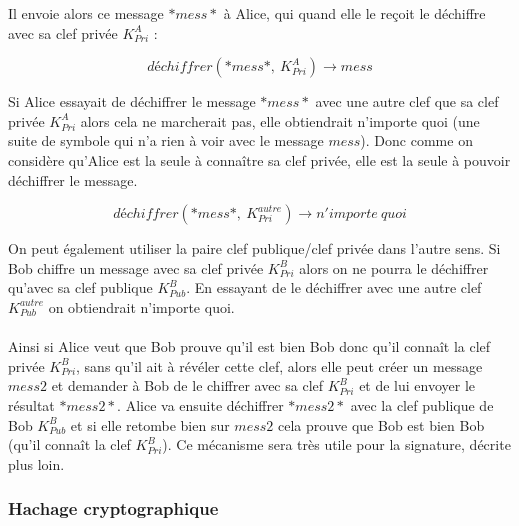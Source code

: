 \documentclass[11pt,a4paper]{article}
\begin{document}
Il envoie alors ce message $*mess*$ à Alice, qui quand elle le reçoit le déchiffre avec sa clef privée $K_{Pri}^{A}$ :

$$déchiffrer(*mess*, ~K_{Pri}^{A}) \rightarrow mess$$

Si Alice essayait de déchiffrer le message $*mess*$ avec une autre clef que sa clef privée $K_{Pri}^{A}$ alors cela ne marcherait pas, elle obtiendrait n'importe quoi (une suite de symbole qui n'a rien à voir avec le message $mess$). Donc comme on considère qu'Alice est la seule à connaître sa clef privée, elle est la seule à pouvoir déchiffrer le message.

$$déchiffrer(*mess*, ~K_{Pri}^{autre}) \rightarrow n'importe~quoi$$

On peut également utiliser la paire clef publique/clef privée dans l'autre sens. Si Bob chiffre un message avec sa clef privée $K_{Pri}^{B}$ alors on ne pourra le déchiffrer qu'avec sa clef publique $K_{Pub}^{B}$. En essayant de le déchiffrer avec une autre clef $K_{Pub}^{autre}$ on obtiendrait n'importe quoi.\\\\ Ainsi si Alice veut que Bob prouve qu'il est bien Bob donc qu'il connaît la clef privée $K_{Pri}^{B}$, sans qu'il ait à révéler cette clef, alors elle peut créer un message $mess2$ et demander à Bob de le chiffrer avec sa clef $K_{Pri}^{B}$ et de lui envoyer le résultat $*mess2*$. Alice va ensuite déchiffrer $*mess2*$ avec la clef publique de Bob $K_{Pub}^{B}$ et si elle retombe bien sur $mess2$ cela prouve que Bob est bien Bob (qu'il connaît la clef $K_{Pri}^{B}$). Ce mécanisme sera très utile pour la signature, décrite plus loin.
\subsubsection{Hachage cryptographique}
\end{document}
